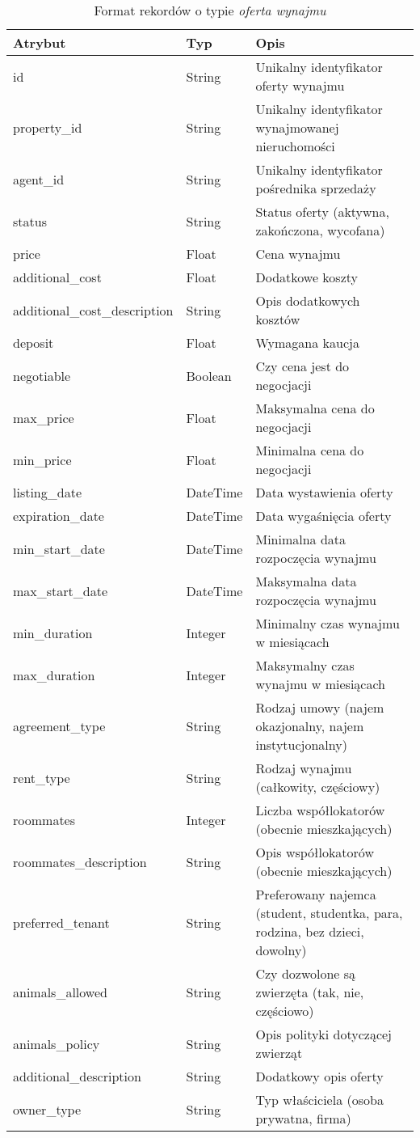 \begin{table}[H]
    \caption{Format rekordów o typie \textit{oferta wynajmu}}
    \centering
    \begin{tabular}{|l|l|l|}
    \hline
    \textbf{Atrybut} & \textbf{Typ} & \textbf{Opis} \\
    \hline
    id & String & Unikalny identyfikator oferty wynajmu \\
    property\_id & String & Unikalny identyfikator wynajmowanej nieruchomości \\
    agent\_id & String & Unikalny identyfikator pośrednika sprzedaży \\
    status & String & Status oferty (aktywna, zakończona, wycofana) \\
    price & Float & Cena wynajmu \\
    additional\_cost & Float & Dodatkowe koszty \\
    additional\_cost\_description & String & Opis dodatkowych kosztów \\
    deposit & Float & Wymagana kaucja \\
    negotiable & Boolean & Czy cena jest do negocjacji \\    
    max\_price & Float & Maksymalna cena do negocjacji \\
    min\_price & Float & Minimalna cena do negocjacji \\
    listing\_date & DateTime & Data wystawienia oferty \\
    expiration\_date & DateTime & Data wygaśnięcia oferty \\
    min\_start\_date & DateTime & Minimalna data rozpoczęcia wynajmu \\
    max\_start\_date & DateTime & Maksymalna data rozpoczęcia wynajmu \\
    min\_duration & Integer & Minimalny czas wynajmu w miesiącach \\
    max\_duration & Integer & Maksymalny czas wynajmu w miesiącach \\
    agreement\_type & String & Rodzaj umowy (najem okazjonalny, najem instytucjonalny) \\
    rent\_type & String & Rodzaj wynajmu (całkowity, częściowy) \\
    roommates & Integer & Liczba współlokatorów (obecnie mieszkających) \\
    roommates\_description & String & Opis współlokatorów (obecnie mieszkających) \\
    preferred\_tenant & String & Preferowany najemca (student, studentka, para, rodzina, bez dzieci, dowolny) \\
    animals\_allowed & String & Czy dozwolone są zwierzęta (tak, nie, częściowo) \\
    animals\_policy & String & Opis polityki dotyczącej zwierząt \\
    additional\_description & String & Dodatkowy opis oferty \\
    owner\_type & String & Typ właściciela (osoba prywatna, firma) \\
    \hline
    \end{tabular}
    \label{tab:rent_offer_details}
\end{table}

